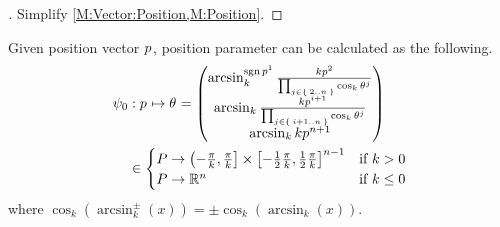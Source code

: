 \documentclass[../main.tex]{subfiles}
\begin{document}
\begin{proof}[]
    Simplify \cref{M:Vector:Position,M:Position}.
\end{proof}
\begin{lemma}\label{M:Parameter:Value}
    Given position vector $\tensor{p}{}$, position parameter can be calculated as the following.
    \begin{align*}
        \psi_0
         & : \tensor{p}{} \mapsto \tensor{\theta}{}
        =
        \begin{pmatrix}
            \arcsin_k^{\sign{\tensor{p}{^1}}}{\frac{k\tensor{p}{^2}}{\prod_{j\in\Set{2..n}}{\cos_k{\tensor{\theta}{^j}}}}} \\
            \arcsin_k{\frac{k\tensor{p}{^{i+1}}}{\prod_{j\in\Set{i+1..n}}{\cos_k{\tensor{\theta}{^j}}}}}                   \\
            \arcsin_k{k\tensor{p}{^{n+1}}}                                                                                 \\
        \end{pmatrix} \\
         & \in
        \begin{cases}
            P \to \left(-\frac{\pi}{k}, \frac{\pi}{k}\right]\times\left[-\frac{1}{2}\frac{\pi}{k}, \frac{1}{2}\frac{\pi}{k}\right]^{n-1} & \text{if $k>0$}   \\
            P \to \R^{n}                                                                                                                 & \text{if $k\le0$} \\
        \end{cases}
    \end{align*}
    where $\cos_k\left(\arcsin_k^{\pm}\left(x\right)\right) = \pm \cos_k\left(\arcsin_k\left(x\right)\right)$.
\end{lemma}
\end{document}
